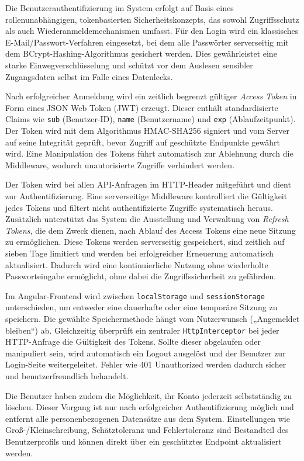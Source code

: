 \documentclass[a4paper,12pt]{article}
\begin{document}
Die Benutzerauthentifizierung im System erfolgt auf Basis eines rollenunabhängigen, tokenbasierten Sicherheitskonzepts, das sowohl Zugriffsschutz als auch Wiederanmeldemechanismen umfasst. Für den Login wird ein klassisches E-Mail/Passwort-Verfahren eingesetzt, bei dem alle Passwörter serverseitig mit dem BCrypt-Hashing-Algorithmus gesichert werden. Dies gewährleistet eine starke Einwegverschlüsselung und schützt vor dem Auslesen sensibler Zugangsdaten selbst im Falle eines Datenlecks.

Nach erfolgreicher Anmeldung wird ein zeitlich begrenzt gültiger \textit{Access Token} in Form eines JSON Web Token (JWT) erzeugt. Dieser enthält standardisierte Claims wie \texttt{sub} (Benutzer-ID), \texttt{name} (Benutzername) und \texttt{exp} (Ablaufzeitpunkt). Der Token wird mit dem Algorithmus HMAC-SHA256 signiert und vom Server auf seine Integrität geprüft, bevor Zugriff auf geschützte Endpunkte gewährt wird. Eine Manipulation des Tokens führt automatisch zur Ablehnung durch die Middleware, wodurch unautorisierte Zugriffe verhindert werden.

Der Token wird bei allen API-Anfragen im HTTP-Header mitgeführt und dient zur Authentifizierung. Eine serverseitige Middleware kontrolliert die Gültigkeit jedes Tokens und filtert nicht authentifizierte Zugriffe systematisch heraus. Zusätzlich unterstützt das System die Ausstellung und Verwaltung von \textit{Refresh Tokens}, die dem Zweck dienen, nach Ablauf des Access Tokens eine neue Sitzung zu ermöglichen. Diese Tokens werden serverseitig gespeichert, sind zeitlich auf sieben Tage limitiert und werden bei erfolgreicher Erneuerung automatisch aktualisiert. Dadurch wird eine kontinuierliche Nutzung ohne wiederholte Passworteingabe ermöglicht, ohne dabei die Zugriffssicherheit zu gefährden.

Im Angular-Frontend wird zwischen \texttt{localStorage} und \texttt{sessionStorage} unterschieden, um entweder eine dauerhafte oder eine temporäre Sitzung zu speichern. Die gewählte Speichermethode hängt vom Nutzerwunsch („Angemeldet bleiben“) ab. Gleichzeitig überprüft ein zentraler \texttt{HttpInterceptor} bei jeder HTTP-Anfrage die Gültigkeit des Tokens. Sollte dieser abgelaufen oder manipuliert sein, wird automatisch ein Logout ausgelöst und der Benutzer zur Login-Seite weitergeleitet. Fehler wie 401 Unauthorized werden dadurch sicher und benutzerfreundlich behandelt.

Die Benutzer haben zudem die Möglichkeit, ihr Konto jederzeit selbstständig zu löschen. Dieser Vorgang ist nur nach erfolgreicher Authentifizierung möglich und entfernt alle personenbezogenen Datensätze aus dem System. Einstellungen wie Groß-/Kleinschreibung, Schätztoleranz und Fehlertoleranz sind Bestandteil des Benutzerprofils und können direkt über ein geschütztes Endpoint aktualisiert werden.
\end{document}
